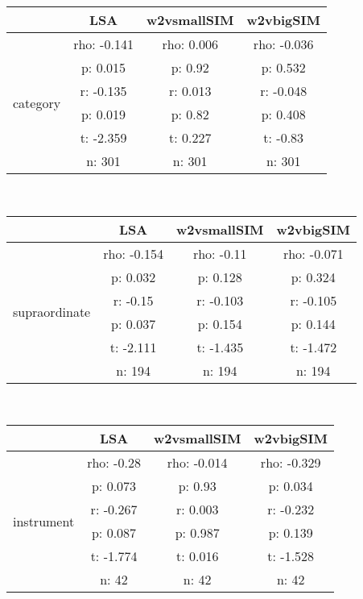 \documentclass{article}
\begin{document}
\begin{tabular}{cccc|}\cline{2-4}
&\multicolumn{1}{|c}{LSA} & w2vsmallSIM & w2vbigSIM \\\hline
\multicolumn{1}{|c|}{\multirow{6}{*}{category}} & rho: -0.141 & rho: 0.006 & rho: -0.036 \\
\multicolumn{1}{|c|}{} & p: 0.015 & p: 0.92 & p: 0.532 \\
\multicolumn{1}{|c|}{} & r: -0.135 & r: 0.013 & r: -0.048 \\
\multicolumn{1}{|c|}{} & p: 0.019 & p: 0.82 & p: 0.408 \\
\multicolumn{1}{|c|}{} & t: -2.359 & t: 0.227 & t: -0.83 \\
\multicolumn{1}{|c|}{} & n: 301 & n: 301 & n: 301 \\
\hline
\end{tabular}\\
\begin{tabular}{cccc|}\cline{2-4}
&\multicolumn{1}{|c}{LSA} & w2vsmallSIM & w2vbigSIM \\\hline
\multicolumn{1}{|c|}{\multirow{6}{*}{supraordinate}} & rho: -0.154 & rho: -0.11 & rho: -0.071 \\
\multicolumn{1}{|c|}{} & p: 0.032 & p: 0.128 & p: 0.324 \\
\multicolumn{1}{|c|}{} & r: -0.15 & r: -0.103 & r: -0.105 \\
\multicolumn{1}{|c|}{} & p: 0.037 & p: 0.154 & p: 0.144 \\
\multicolumn{1}{|c|}{} & t: -2.111 & t: -1.435 & t: -1.472 \\
\multicolumn{1}{|c|}{} & n: 194 & n: 194 & n: 194 \\
\hline
\end{tabular}\\
\begin{tabular}{cccc|}\cline{2-4}
&\multicolumn{1}{|c}{LSA} & w2vsmallSIM & w2vbigSIM \\\hline
\multicolumn{1}{|c|}{\multirow{6}{*}{instrument}} & rho: -0.28 & rho: -0.014 & rho: -0.329 \\
\multicolumn{1}{|c|}{} & p: 0.073 & p: 0.93 & p: 0.034 \\
\multicolumn{1}{|c|}{} & r: -0.267 & r: 0.003 & r: -0.232 \\
\multicolumn{1}{|c|}{} & p: 0.087 & p: 0.987 & p: 0.139 \\
\multicolumn{1}{|c|}{} & t: -1.774 & t: 0.016 & t: -1.528 \\
\multicolumn{1}{|c|}{} & n: 42 & n: 42 & n: 42 \\
\hline
\end{tabular}\\
\end{document}
